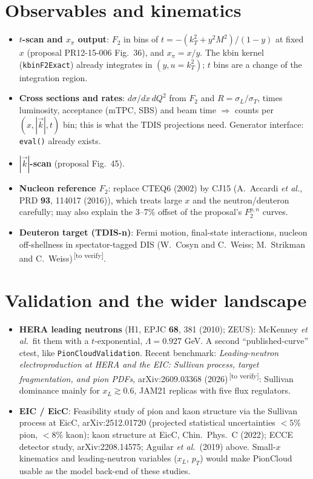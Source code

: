 \documentclass[11pt,a4paper]{article}
\newcommand{\picloud}{PionCloud}
\newcommand{\code}[1]{\texttt{#1}}
\newcommand{\verify}{\textsuperscript{\,[to verify]}}
\begin{document}
\section{Observables and kinematics}
\begin{itemize}
\item \textbf{$t$-scan and $x_\pi$ output}: $F_2$ in bins of
  $t=-(k_T^2+y^2M^2)/(1-y)$ at fixed $x$ (proposal PR12-15-006 Fig.~36), and
  $x_\pi=x/y$.  The kbin kernel (\code{kbinF2Exact}) already integrates in
  $(y,u=k_T^2)$; $t$ bins are a change of the integration region.
\item \textbf{Cross sections and rates}: $d\sigma/dx\,dQ^2$ from $F_2$ and
  $R=\sigma_L/\sigma_T$, times luminosity, acceptance (mTPC, SBS) and beam
  time $\Rightarrow$ counts per $(x,|\vec k|,t)$ bin; this is what the TDIS
  projections need.  Generator interface: \code{eval()} already exists.
\item \textbf{$|\vec k|$-scan} (proposal Fig.~45).
\item \textbf{Nucleon reference $F_2$}: replace CTEQ6 (2002) by CJ15
  (A.~Accardi \textit{et al.}, PRD \textbf{93}, 114017 (2016)), which treats
  large $x$ and the neutron/deuteron carefully; may also explain the 3--7\%
  offset of the proposal's $F_2^{p,n}$ curves.
\item \textbf{Deuteron target (TDIS-n)}: Fermi motion, final-state
  interactions, nucleon off-shellness in spectator-tagged DIS
  (W.~Cosyn and C.~Weiss; M.~Strikman and C.~Weiss)\verify{}.
\end{itemize}

\section{Validation and the wider landscape}
\begin{itemize}
\item \textbf{HERA leading neutrons} (H1, EPJC \textbf{68}, 381 (2010); ZEUS):
  McKenney \textit{et al.}\ fit them with a $t$-exponential, $\Lambda=0.927$
  GeV.  A second ``published-curve'' ctest, like \code{PionCloudValidation}.
  Recent benchmark: \emph{Leading-neutron electroproduction at HERA and the
  EIC: Sullivan process, target fragmentation, and pion PDFs},
  arXiv:2609.03368 (2026)\verify{}: Sullivan dominance mainly for
  $x_L\gtrsim0.6$, JAM21 replicas with five flux regulators.
\item \textbf{EIC / EicC}: Feasibility study of pion and kaon structure via
  the Sullivan process at EicC, arXiv:2512.01720 (projected statistical
  uncertainties $<5\%$ pion, $<8\%$ kaon); kaon structure at EicC,
  Chin.\ Phys.\ C (2022); ECCE detector study, arXiv:2208.14575;
  Aguilar \textit{et al.}\ (2019) above.  Small-$x$ kinematics and
  leading-neutron variables ($x_L$, $p_T$) would make \picloud{} usable as the
  model back-end of these studies.
\end{itemize}
\end{document}
